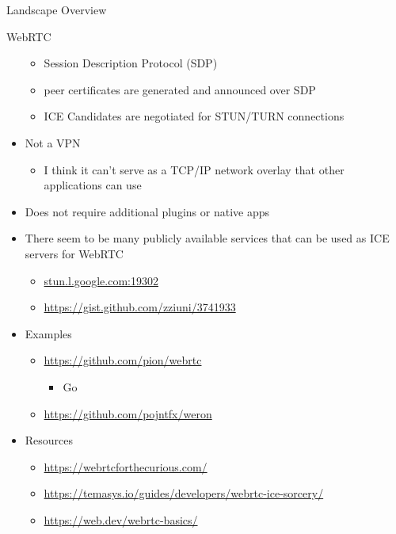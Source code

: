 \begin{frame}[fragile]{Landscape Overview}
\begin{block}{WebRTC}
\begin{itemize}
  \begin{itemize}
  \tightlist
  \item
    Session Description Protocol (SDP)
  \item
    peer certificates are generated and announced over SDP
  \item
    ICE Candidates are negotiated for STUN/TURN connections
  \end{itemize}
\item
  Not a VPN

  \begin{itemize}
  \tightlist
  \item
    I think it can't serve as a TCP/IP network overlay that other
    applications can use
  \end{itemize}
\item
  Does not require additional plugins or native apps
\item
  There seem to be many publicly available services that can be used as
  ICE servers for WebRTC

  \begin{itemize}
  \tightlist
  \item
    \href{http://stun.l.google.com:19302/}{stun.l.google.com:19302}
  \item
    \url{https://gist.github.com/zziuni/3741933}
  \end{itemize}
\item
  Examples

  \begin{itemize}
  \tightlist
  \item
    \url{https://github.com/pion/webrtc}

    \begin{itemize}
    \tightlist
    \item
      Go
    \end{itemize}
  \item
    \url{https://github.com/pojntfx/weron}
  \end{itemize}
\item
  Resources

  \begin{itemize}
  \tightlist
  \item
    \url{https://webrtcforthecurious.com/}
  \item
    \url{https://temasys.io/guides/developers/webrtc-ice-sorcery/}
  \item
    \href{https://web.dev/webrtc-basics/\#toc-rtcpeerconnection}{https://web.dev/webrtc-basics/}
  \end{itemize}
\end{itemize}
\end{block}


\end{frame}

